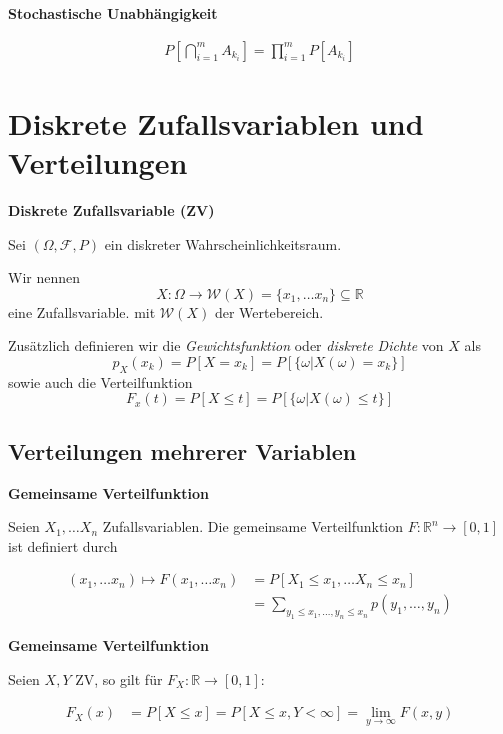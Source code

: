 \documentclass[25pt]{sciposter}
\newcommand{\R}{\mathbb{R}}
\newcommand{\F}{\mathcal{F}}
\newcommand{\W}{\mathcal{W}}
\newenvironment{method}[1]{\begin{mdframed}[backgroundcolor=blue!10,innertopmargin=15pt, innerbottommargin=15pt,nobreak=true]
		\textbf{#1 }
	}
	{ 
	\end{mdframed}
}
\begin{document}
\begin{multicols}{3}
\begin{method}{Stochastische Unabhängigkeit}
			\begin{align*}
				P\left[\bigcap_{i=1}^{m} A_{k_i} \right] = \prod_{i=1}^{m}P[A_{k_i}]
			\end{align*}
			
		\end{method}
		
		
		\section{Diskrete Zufallsvariablen und Verteilungen}
		
		
		
		\begin{method}{Diskrete Zufallsvariable (ZV)}
			Sei $(\Omega, \F, P)$ ein diskreter Wahrscheinlichkeitsraum.
			
			Wir nennen 
			$$X:\Omega \to \W(X) = \{x_1,\ldots x_n\}\subseteq \R$$
			eine Zufallsvariable. mit $\W(X)$ der Wertebereich.
			
			Zusätzlich definieren wir die \textit{Gewichtsfunktion} oder \textit{diskrete Dichte} von $X$ als 
			$$p_X(x_k) = P[X = x_k] = P[\{ \omega | X(\omega) = x_k \}]$$
			sowie auch die Verteilfunktion 
			$$F_x(t) = P[X\leq t] = P[\{\omega | X(\omega) \leq t\}]$$
			
		\end{method}
		
		\subsection*{Verteilungen mehrerer Variablen}
		
		
		\begin{method}{Gemeinsame Verteilfunktion}
			Seien $X_1,\ldots X_n$ Zufallsvariablen. Die gemeinsame Verteilfunktion $F:\R^n \to [0,1]$ ist definiert durch
			
			\begin{align*}
				(x_1,\ldots x_n)\mapsto F(x_1,\ldots x_n) &= P[X_1 \leq x_1, \ldots X_n \leq x_n]\\
				&= \sum_{y_1 \leq x_1, \ldots, y_n \leq x_n} p(y_1,\ldots, y_n)
			\end{align*}
			
			
		\end{method}
		
		\begin{method}{Gemeinsame Verteilfunktion}
			Seien $X,Y$ ZV, so gilt für $F_X : \R \to [0,1]$:
			
			\begin{align*}
				F_X(x) &= P[X \leq x] = P[X \leq x , Y < \infty] = \lim\limits_{y\to\infty} F(x,y)
			\end{align*}
		\end{method}
		

\end{multicols}
\end{document}
